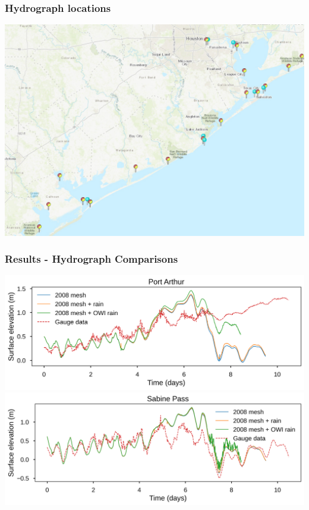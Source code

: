 \documentclass[10pt]{oden_beamer}
\begin{document}
\begin{frame}
  \frametitle{Hydrograph locations}
  \centering
  \includegraphics[width=0.9\linewidth]{stations.png}
\end{frame}

\begin{frame}
  \frametitle{Results - Hydrograph Comparisons}
  \centering
  \includegraphics[width=0.9\linewidth]{port_arthur.png}
  \centering
  \includegraphics[width=0.9\linewidth]{sabine_pass.png}
\end{frame}
\end{document}
